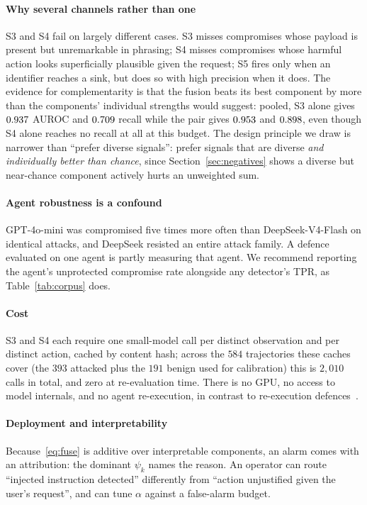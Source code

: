 \documentclass[pdflatex,sn-basic]{sn-jnl}%
\theoremstyle{thmstyleone}
\theoremstyle{thmstyletwo}
\theoremstyle{thmstylethree}
\begin{document}
\paragraph{Why several channels rather than one} S3 and S4 fail on largely
different cases. S3 misses compromises whose payload is present but unremarkable
in phrasing; S4 misses compromises whose harmful action looks superficially
plausible given the request; S5 fires only when an identifier reaches a sink, but
does so with high precision when it does. The evidence for complementarity is that
the fusion beats its best component by more than the components' individual
strengths would suggest: pooled, S3 alone gives $0.937$ AUROC and
$0.709$ recall while the pair gives $0.953$ and $0.898$,
even though S4 alone reaches no recall at all at this budget. The design principle we draw is narrower
than ``prefer diverse signals'': prefer signals that are diverse \emph{and
individually better than chance}, since Section~\ref{sec:negatives} shows a
diverse but near-chance component actively hurts an unweighted sum.

\paragraph{Agent robustness is a confound} GPT-4o-mini was compromised five
times more often than DeepSeek-V4-Flash on identical attacks, and DeepSeek
resisted an entire attack family. A defence evaluated on one agent is partly
measuring that agent. We recommend reporting the agent's unprotected compromise
rate alongside any detector's TPR, as Table~\ref{tab:corpus} does.

\paragraph{Cost} S3 and S4 each require one small-model call per distinct observation and per distinct
action, cached by content hash; across the $584$ trajectories these caches cover
(the $393$ attacked plus the $191$ benign used for calibration) this is $2{,}010$
calls in total, and zero at re-evaluation time. There is no GPU, no access to model
internals, and no agent re-execution, in contrast to
re-execution defences~\citep{zhu2025melon}.

\paragraph{Deployment and interpretability} Because~\eqref{eq:fuse} is additive
over interpretable components, an alarm comes with an attribution: the dominant
$\psi_k$ names the reason. An operator can route ``injected instruction detected''
differently from ``action unjustified given the user's request'', and can tune
$\alpha$ against a false-alarm budget.
\end{document}
